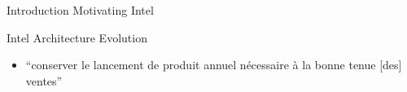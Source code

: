 %
\begin{Frame}{Introduction Motivating Intel}
      \begin{block}{Intel Architecture Evolution}
                
        \begin{itemize}
        \item ``conserver le lancement de produit annuel nécessaire à
          la bonne tenue [des] ventes''
        \end{itemize}
      \end{block} 
\end{Frame}


